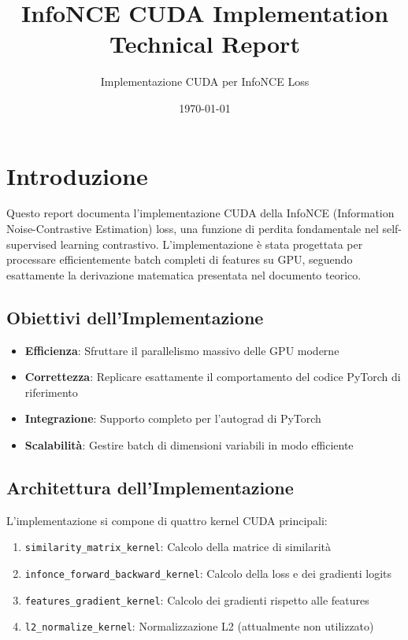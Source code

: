 \documentclass[a4paper,11pt]{article}
\title{InfoNCE CUDA Implementation\\Technical Report}
\author{Implementazione CUDA per InfoNCE Loss}
\date{\today}
\begin{document}
\maketitle

\tableofcontents
\newpage

\section{Introduzione}

Questo report documenta l'implementazione CUDA della InfoNCE (Information Noise-Contrastive Estimation) loss, una funzione di perdita fondamentale nel self-supervised learning contrastivo. L'implementazione è stata progettata per processare efficientemente batch completi di features su GPU, seguendo esattamente la derivazione matematica presentata nel documento teorico.

\subsection{Obiettivi dell'Implementazione}

\begin{itemize}
    \item \textbf{Efficienza}: Sfruttare il parallelismo massivo delle GPU moderne
    \item \textbf{Correttezza}: Replicare esattamente il comportamento del codice PyTorch di riferimento
    \item \textbf{Integrazione}: Supporto completo per l'autograd di PyTorch
    \item \textbf{Scalabilità}: Gestire batch di dimensioni variabili in modo efficiente
\end{itemize}

\subsection{Architettura dell'Implementazione}

L'implementazione si compone di quattro kernel CUDA principali:
\begin{enumerate}
    \item \texttt{similarity\_matrix\_kernel}: Calcolo della matrice di similarità
    \item \texttt{infonce\_forward\_backward\_kernel}: Calcolo della loss e dei gradienti logits
    \item \texttt{features\_gradient\_kernel}: Calcolo dei gradienti rispetto alle features
    \item \texttt{l2\_normalize\_kernel}: Normalizzazione L2 (attualmente non utilizzato)
\end{enumerate}
\end{document}
